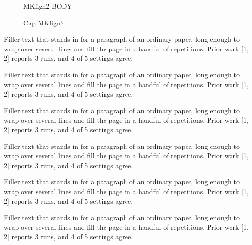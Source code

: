 \documentclass{article}
\begin{document}
\begin{figure}[t]\centering MKfign2 BODY\caption{Cap MKfign2}\label{fig:n2}\end{figure}
Filler text that stands in for a paragraph of an ordinary paper, long enough to wrap over several lines and fill the page in a handful of repetitions. Prior work [1, 2] reports 3 runs, and 4 of 5 settings agree.\par
Filler text that stands in for a paragraph of an ordinary paper, long enough to wrap over several lines and fill the page in a handful of repetitions. Prior work [1, 2] reports 3 runs, and 4 of 5 settings agree.\par
Filler text that stands in for a paragraph of an ordinary paper, long enough to wrap over several lines and fill the page in a handful of repetitions. Prior work [1, 2] reports 3 runs, and 4 of 5 settings agree.\par
Filler text that stands in for a paragraph of an ordinary paper, long enough to wrap over several lines and fill the page in a handful of repetitions. Prior work [1, 2] reports 3 runs, and 4 of 5 settings agree.\par
Filler text that stands in for a paragraph of an ordinary paper, long enough to wrap over several lines and fill the page in a handful of repetitions. Prior work [1, 2] reports 3 runs, and 4 of 5 settings agree.\par
Filler text that stands in for a paragraph of an ordinary paper, long enough to wrap over several lines and fill the page in a handful of repetitions. Prior work [1, 2] reports 3 runs, and 4 of 5 settings agree.\par
\end{document}
